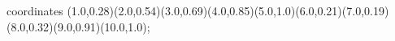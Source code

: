 					coordinates { (1.0,0.28)(2.0,0.54)(3.0,0.69)(4.0,0.85)(5.0,1.0)(6.0,0.21)(7.0,0.19)(8.0,0.32)(9.0,0.91)(10.0,1.0)};